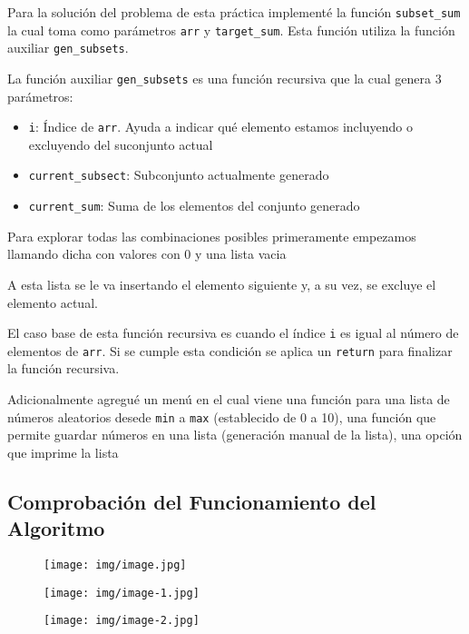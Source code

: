 \documentclass[12pt, a4paper]{article} %
\begin{document}
Para la solución del problema de esta práctica implementé la función \texttt{subset\_sum} la cual toma como parámetros \texttt{arr} y \texttt{target\_sum}. Esta función utiliza la función auxiliar \texttt{gen\_subsets}.

La función auxiliar \texttt{gen\_subsets} es una función recursiva que la cual genera 3 parámetros:

\begin{itemize}
	\item \texttt{i}: Índice de \texttt{arr}. Ayuda a indicar qué elemento estamos incluyendo o excluyendo del suconjunto actual
	\item \texttt{current\_subsect}: Subconjunto actualmente generado
	\item \texttt{current\_sum}: Suma de los elementos del conjunto generado
\end{itemize}

Para explorar todas las combinaciones posibles primeramente empezamos llamando dicha con valores con 0 y una lista vacia

A esta lista se le va insertando el elemento siguiente y, a su vez, se excluye el elemento actual.

El caso base de esta función recursiva es cuando el índice \texttt{i} es igual al número de elementos de \texttt{arr}. Si se cumple esta condición se aplica un \texttt{return} para finalizar la función recursiva.

Adicionalmente agregué un menú en el cual viene una función para una lista de números aleatorios desede \texttt{min} a \texttt{max} (establecido de 0 a 10), una función que permite guardar números en una lista (generación manual de la lista), una opción que imprime la lista   

\subsection{Comprobación del Funcionamiento del Algoritmo}

\begin{figure}[h]
	\centering
	\texttt{[image: img/image.jpg]}
\end{figure}

\begin{figure}[h]
	\centering
	\texttt{[image: img/image-1.jpg]}
\end{figure}

\begin{figure}[h]
	\centering
	\texttt{[image: img/image-2.jpg]}
\end{figure}
\end{document}
